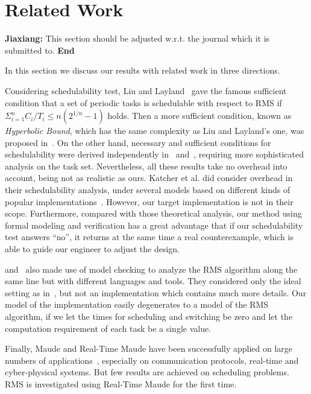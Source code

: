 \documentclass[10pt,journal,compsoc]{IEEEtran}
\newcommand{\jx}[1]{{\bf Jiaxiang: }#1{ \bf End}}
\begin{document}
\section{Related Work}
\label{s:relate}
\jx{This section should be adjusted w.r.t. the journal which it is
  submitted to.}  

In this section we discuss our results with related
work in three directions.

Considering schedulability test, Liu and
Layland~\cite{DBLP:journals/jacm/LiuL73} gave the famous sufficient
condition that a set of periodic tasks is schedulable with respect to
RMS if $\displaystyle \Sigma^n_{i=1} C_i/T_i \le n(2^{1/n}-1)$
holds. Then a more sufficient condition, known as \emph{Hyperbolic
  Bound}, which has the same complexity as Liu and Layland's one, was
proposed in~\cite{DBLP:journals/tc/BiniBB03}. On the other hand,
necessary and sufficient conditions for schedulability were derived
independently in~\cite{DBLP:journals/rts/SpruntSL89}
and~\cite{audsley1993deadline}, requiring more sophisticated analysis
on the task set. Nevertheless, all these results take no overhead into
account, being not as realistic as ours. Katcher et al. did consider
overhead in their schedulability analysis, under several models based
on different kinds of popular
implementations~\cite{DBLP:journals/tse/KatcherAS93}.  However, our
target implementation is not in their scope.  Furthermore, compared
with those theoretical analysis, our method using formal modeling and
verification has a great advantage that if our schedulability test
answers ``no'', it returns at the same time a real counterexample,
which is able to guide our engineer to adjust the design.

\cite{DBLP:conf/iceccs/CuiDT14} and~\cite{TianD2011} also made use of
model checking to analyze the RMS algorithm along the same line but
with different languages and tools. They considered only the ideal
setting as in~\cite{DBLP:journals/jacm/LiuL73}, but not an
implementation which contains much more details. Our model of the
implementation easily degenerates to a model of the RMS algorithm, if
we let the times for scheduling and switching be zero and let the
computation requirement of each task be a single value.

Finally, Maude and Real-Time Maude have been successfully applied on
large numbers of applications~\cite{DBLP:journals/jlp/Meseguer12},
especially on communication protocols, real-time and cyber-physical
systems. But few results are achieved on scheduling problems. RMS is
investigated using Real-Time Maude for the first time.
\end{document}
